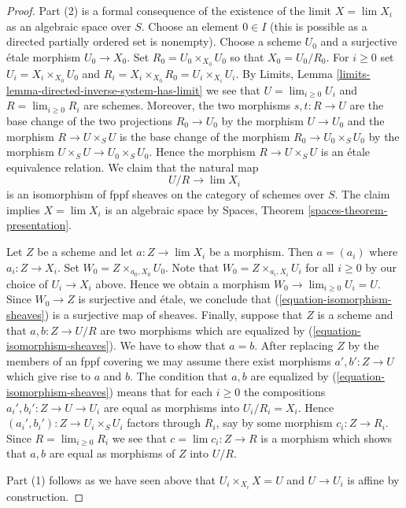 \begin{proof}
Part (2) is a formal consequence of the existence of the
limit $X = \lim X_i$ as an algebraic space over $S$.
Choose an element $0 \in I$ (this is possible as a directed partially
ordered set is nonempty). Choose a scheme $U_0$ and a surjective
\'etale morphism $U_0 \to X_0$. Set $R_0 = U_0 \times_{X_0} U_0$
so that $X_0 = U_0/R_0$. For $i \geq 0$ set
$U_i = X_i \times_{X_0} U_0$ and
$R_i = X_i \times_{X_0} R_0 = U_i \times_{X_i} U_i$.
By Limits, Lemma \ref{limits-lemma-directed-inverse-system-has-limit}
we see that $U = \lim_{i \geq 0} U_i$ and $R = \lim_{i \geq 0} R_i$
are schemes. Moreover, the two morphisms $s, t : R \to U$ are the base
change of the two projections $R_0 \to U_0$ by the morphism
$U \to U_0$ and the morphism $R \to U \times_S U$ is the base change
of the morphism $R_0 \to U_0 \times_S U_0$ by the morphism
$U \times_S U \to U_0 \times_S U_0$. Hence the morphism
$R \to U \times_S U$ is an \'etale equivalence relation. We claim that
the natural map
\begin{equation}
\label{equation-isomorphism-sheaves}
U/R \longrightarrow \lim X_i
\end{equation}
is an isomorphism of fppf sheaves on the category of schemes over $S$.
The claim implies $X = \lim X_i$ is an algebraic
space by Spaces, Theorem \ref{spaces-theorem-presentation}.

\medskip\noindent
Let $Z$ be a scheme and let $a : Z \to \lim X_i$ be a morphism.
Then $a = (a_i)$ where $a_i : Z \to X_i$. Set $W_0 = Z \times_{a_0, X_0} U_0$.
Note that $W_0 = Z \times_{a_i, X_i} U_i$ for all $i \geq 0$ by our
choice of $U_i \to X_i$ above. Hence we obtain a morphism
$W_0 \to \lim_{i \geq 0} U_i = U$. Since $W_0 \to Z$ is surjective
and \'etale, we conclude that (\ref{equation-isomorphism-sheaves})
is a surjective map of sheaves. Finally, suppose that
$Z$ is a scheme and that $a, b : Z \to U/R$ are two morphisms
which are equalized by (\ref{equation-isomorphism-sheaves}).
We have to show that $a = b$.
After replacing $Z$ by the members of an fppf covering
we may assume there exist morphisms $a', b' : Z \to U$ which
give rise to $a$ and $b$. The condition that $a, b$ are
equalized by (\ref{equation-isomorphism-sheaves}) means that
for each $i \geq 0$ the compositions $a_i', b_i' : Z \to U \to U_i$
are equal as morphisms into $U_i/R_i = X_i$. Hence
$(a_i', b_i') : Z \to U_i \times_S U_i$ factors through
$R_i$, say by some morphism $c_i : Z \to R_i$. Since
$R = \lim_{i \geq 0} R_i$ we see that $c = \lim c_i : Z \to R$
is a morphism which shows that $a, b$ are equal as morphisms
of $Z$ into $U/R$.

\medskip\noindent
Part (1) follows as we have seen above that
$U_i \times_{X_i} X = U$ and $U \to U_i$ is affine by
construction.
\end{proof}

